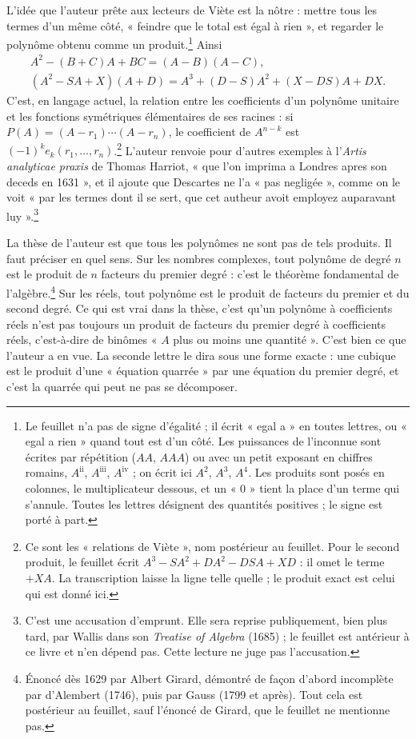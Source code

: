 \documentclass[11pt,a4paper]{article}
\begin{document}
L'idée que l'auteur prête aux lecteurs de Viète est la nôtre : mettre tous les
termes d'un même côté, « feindre que le total est égal à rien », et regarder le
polynôme obtenu comme un produit.\footnote{Le feuillet n'a pas de signe
d'égalité ; il écrit « egal a » en toutes lettres, ou « egal a rien » quand
tout est d'un côté. Les puissances de l'inconnue sont écrites par répétition
(\(AA\), \(AAA\)) ou avec un petit exposant en chiffres romains,
\(A^{\mathrm{ii}}\), \(A^{\mathrm{iii}}\), \(A^{\mathrm{iv}}\) ; on écrit ici
\(A^2\), \(A^3\), \(A^4\). Les produits sont posés en colonnes, le multiplicateur
dessous, et un « 0 » tient la place d'un terme qui s'annule. Toutes les lettres
désignent des quantités positives ; le signe est porté à part.} Ainsi
\begin{gather*}
A^2-(B+C)A+BC=(A-B)(A-C),\\
(A^2-SA+X)(A+D)=A^3+(D-S)A^2+(X-DS)A+DX .
\end{gather*}
C'est, en langage actuel, la relation entre les coefficients d'un polynôme
unitaire et les fonctions symétriques élémentaires de ses racines : si
\(P(A)=(A-r_1)\cdots(A-r_n)\), le coefficient de \(A^{n-k}\) est
\((-1)^k e_k(r_1,\dots,r_n)\).\footnote{Ce sont les « relations de Viète »,
nom postérieur au feuillet. Pour le second produit, le feuillet écrit
\(A^3-SA^2+DA^2-DSA+XD\) : il omet le terme \(+XA\). La transcription laisse
la ligne telle quelle ; le produit exact est celui qui est donné ici.} L'auteur
renvoie pour d'autres exemples à l'\emph{Artis analyticae praxis} de Thomas
Harriot, « que l'on imprima a Londres apres son deceds en 1631 », et il ajoute
que Descartes ne l'a « pas negligée », comme on le voit « par les termes dont
il se sert, que cet autheur avoit employez auparavant luy ».\footnote{C'est une
accusation d'emprunt. Elle sera reprise publiquement, bien plus tard, par
Wallis dans son \emph{Treatise of Algebra} (1685) ; le feuillet est antérieur
à ce livre et n'en dépend pas. Cette lecture ne juge pas l'accusation.}

La thèse de l'auteur est que tous les polynômes ne sont pas de tels produits.
Il faut préciser en quel sens. Sur les nombres complexes, tout polynôme de
degré \(n\) est le produit de \(n\) facteurs du premier degré : c'est le
théorème fondamental de l'algèbre.\footnote{Énoncé dès 1629 par Albert Girard,
démontré de façon d'abord incomplète par d'Alembert (1746), puis par Gauss
(1799 et après). Tout cela est postérieur au feuillet, sauf l'énoncé de Girard,
que le feuillet ne mentionne pas.} Sur les réels, tout polynôme est le produit
de facteurs du premier et du second degré. Ce qui est vrai dans la thèse, c'est
qu'un polynôme à coefficients réels n'est pas toujours un produit de facteurs du
premier degré à coefficients réels, c'est-à-dire de binômes « \(A\) plus ou
moins une quantité ». C'est bien ce que l'auteur a en vue. La seconde lettre le
dira sous une forme exacte : une cubique est le produit d'une « équation
quarrée » par une équation du premier degré, et c'est la quarrée qui peut ne
pas se décomposer.
\end{document}
